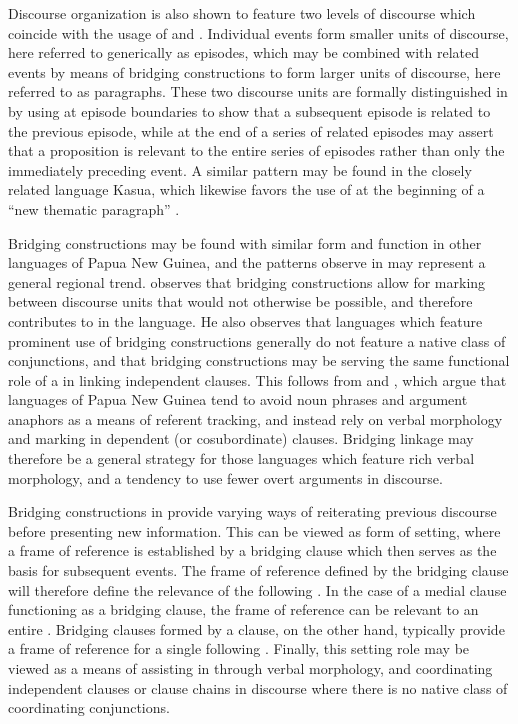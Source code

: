 \documentclass[output=paper]{LSP/langsci}
\begin{document}
Discourse organization is also shown to feature two levels of discourse which coincide with the usage of  and . Individual events form smaller units of discourse, here referred to generically as episodes, which may be combined with related events by means of bridging constructions to form larger units of discourse, here referred to as paragraphs. These two discourse units are formally distinguished in  by using  at episode boundaries to show that a subsequent episode is related to the previous episode, while  at the end of a series of related episodes may assert that a proposition is relevant to the entire series of episodes rather than only the immediately preceding event. A similar pattern may be found in the closely related language Kasua, which likewise favors the use of  at the beginning of a ``new thematic paragraph'' \citep[][24]{logan08}.

Bridging constructions may be found with similar form and function in other languages of Papua New Guinea, and the patterns observe in  may represent a general regional trend. \citet[][]{Jendraschek09} observes that bridging constructions allow for  marking between discourse units that would not otherwise be possible, and therefore contributes to  in the  language. He also observes that languages which feature prominent use of bridging constructions generally do not feature a native class of conjunctions, and that bridging constructions may be serving the same functional role of a  in linking independent clauses. This follows from \citet[][367]{devries.2005} and \citet[][374--375]{longacre07}, which argue that languages of Papua New Guinea tend to avoid noun phrases and argument anaphors as a means of referent tracking, and instead rely on verbal morphology and  marking in dependent (or cosubordinate) clauses. Bridging linkage may therefore be a general  strategy for those languages which feature rich verbal morphology, and a tendency to use fewer overt arguments in discourse.

Bridging constructions in  provide varying ways of reiterating previous discourse before presenting new information. This can be viewed as form of  setting, where a frame of reference is established by a bridging clause which then serves as the basis for subsequent events. The frame of reference defined by the bridging clause will therefore define the relevance of the following . In the case of a medial clause functioning as a bridging clause, the frame of reference can be relevant to an entire . Bridging clauses formed by a  clause, on the other hand, typically provide a frame of reference for a single following . Finally, this  setting role may be viewed as a means of assisting in  through verbal  morphology, and coordinating independent clauses or clause chains in discourse where there is no native class of coordinating conjunctions.
\end{document}
